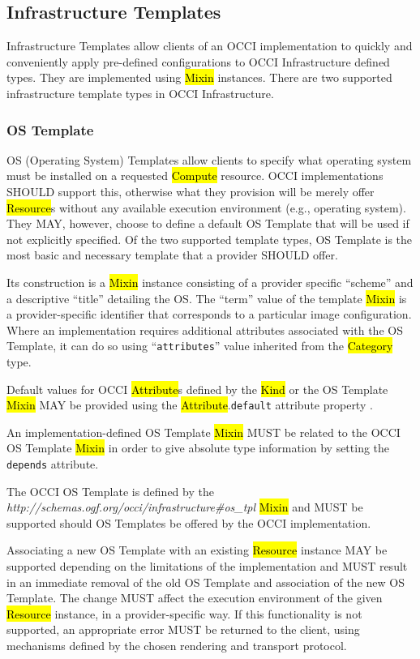 \documentclass[10pt,a4paper]{article}
\begin{document}
\subsection{Infrastructure Templates}
Infrastructure Templates allow clients of an OCCI implementation to
quickly and conveniently apply pre-defined configurations to OCCI
Infrastructure defined types. They are implemented using \hl{Mixin}
instances. There are two supported infrastructure template types in OCCI
Infrastructure.

\subsubsection{OS Template}
\label{subsubsec:os_tpl}
OS (Operating System) Templates allow clients to specify what operating
system must be installed on a requested \hl{Compute} resource. OCCI
implementations SHOULD support this, otherwise what they provision
will be merely offer \hl{Resource}s without any available execution
environment (e.g., operating system). They MAY, however, choose to define
a default OS Template that will be used if not explicitly specified.
Of the two supported template types, OS Template is the most basic
and necessary template that a provider SHOULD offer.

Its construction is a \hl{Mixin} instance consisting of a provider
specific ``scheme'' and a descriptive ``title'' detailing the OS. The
``term'' value of the template \hl{Mixin} is a provider-specific
identifier that corresponds to a particular image configuration. Where
an implementation requires additional attributes associated with the
OS Template, it can do so using ``{\tt attributes}'' value inherited
from the \hl{Category} type.

Default values for OCCI \hl{Attribute}s defined by the \hl{Kind} or the OS
Template \hl{Mixin} MAY be provided using the \hl{Attribute}.{\tt default}
attribute property \cite{occi:core}.

An implementation-defined OS Template \hl{Mixin} MUST be related to the
OCCI OS Template \hl{Mixin} in order to give absolute type
information by setting the \texttt{depends} attribute.

The OCCI OS Template is defined by the
\textit{http://schemas.ogf.org/occi/infrastructure\#os\_tpl}
\hl{Mixin} and MUST be supported should OS Templates be offered by the
OCCI implementation.

Associating a new OS Template with an existing \hl{Resource}
instance MAY be supported depending on the limitations of the implementation
and MUST result in an immediate removal of the old OS Template and
association of the new OS Template. The change MUST affect the execution
environment of the given \hl{Resource} instance, in a provider-specific way.
If this functionality is not supported, an appropriate error MUST be
returned to the client, using mechanisms defined by the chosen rendering
and transport protocol.
\end{document}
